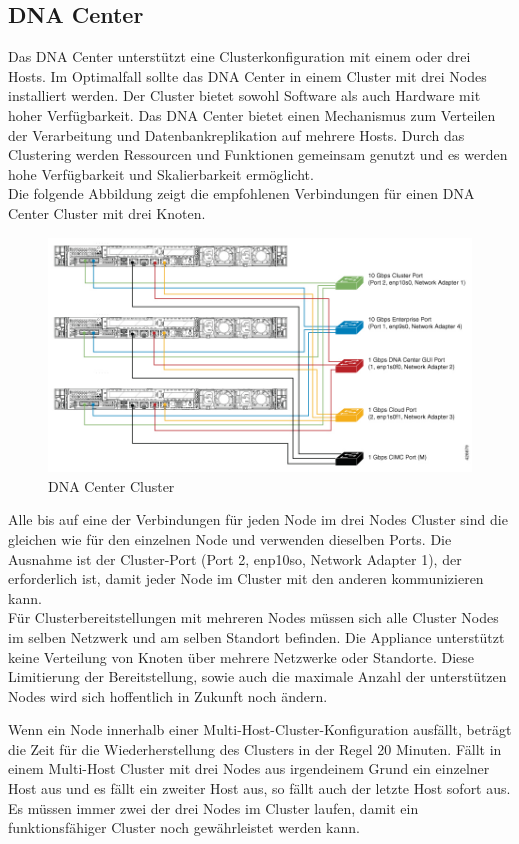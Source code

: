 \subsection{DNA Center}
Das DNA Center unterstützt eine Clusterkonfiguration mit einem oder drei Hosts. Im Optimalfall sollte das DNA Center in einem Cluster mit drei Nodes installiert werden. Der Cluster bietet sowohl Software als auch Hardware mit hoher Verfügbarkeit. Das DNA Center bietet einen Mechanismus zum Verteilen der Verarbeitung und Datenbankreplikation auf mehrere Hosts. Durch das Clustering werden Ressourcen und Funktionen gemeinsam genutzt und es werden hohe Verfügbarkeit und Skalierbarkeit ermöglicht. \\

Die folgende Abbildung zeigt die empfohlenen Verbindungen für einen DNA Center Cluster mit drei Knoten. 
\begin{figure}[H]
	\centering
	\includegraphics[width=0.8\linewidth]{img/Absicherung/DNAC-Cluster}
	\caption{DNA Center Cluster \cite{dnac-cluster} }
	\label{fig:DNA Center Cluster}
\end{figure}
Alle bis auf eine der Verbindungen für jeden Node im drei Nodes Cluster sind die gleichen wie für den einzelnen Node und verwenden dieselben Ports. Die Ausnahme ist der Cluster-Port (Port 2, enp10so, Network Adapter 1), der erforderlich ist, damit jeder Node im Cluster mit den anderen kommunizieren kann. \\

Für Clusterbereitstellungen mit mehreren Nodes müssen sich alle Cluster Nodes im selben Netzwerk und am selben Standort befinden. Die Appliance unterstützt keine Verteilung von Knoten über mehrere Netzwerke oder Standorte. Diese Limitierung der Bereitstellung, sowie auch die maximale Anzahl der unterstützen Nodes wird sich hoffentlich in Zukunft noch ändern.

Wenn ein Node innerhalb einer Multi-Host-Cluster-Konfiguration ausfällt, beträgt die Zeit für die Wiederherstellung des Clusters in der Regel 20 Minuten. Fällt in einem Multi-Host Cluster mit drei Nodes aus irgendeinem Grund ein einzelner Host aus und es fällt ein zweiter Host aus, so fällt auch der letzte Host sofort aus. Es müssen immer zwei der drei Nodes im Cluster laufen, damit ein funktionsfähiger Cluster noch gewährleistet werden kann.






